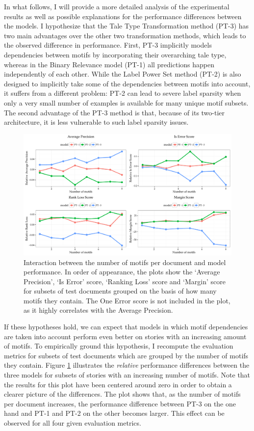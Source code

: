 In what follows, I will provide a more detailed analysis of the experimental results as well as possible explanations for the performance differences between the models. I hypothesize that the Tale Type Transformation method (PT-3) has two main advantages over the other two transformation methods, which leads to the observed difference in performance. First, PT-3 implicitly models dependencies between motifs by incorporating their overarching tale type, whereas in the Binary Relevance model (PT-1) all predictions happen independently of each other. While the Label Power Set method (PT-2) is also designed to implicitly take some of the dependencies between motifs into account, it suffers from a different problem: PT-2 can lead to severe label sparsity when only a very small number of examples is available for many unique motif subsets. The second advantage of the PT-3 method is that, because of its two-tier architecture, it is less vulnerable to such label sparsity issues. 

\begin{figure}[t]
\centering
\includegraphics[width=\textwidth]{images/motif-evaluation-scores-size.pdf}
\caption{Interaction between the number of motifs per document and model performance. In order of appearance, the plots show the `Average Precision', `Is Error' score, `Ranking Loss' score and `Margin' score for subsets of test documents grouped on the basis of how many motifs they contain. The One Error score is not included in the plot, as it highly correlates with the Average Precision.}
\label{fig:motif-size-classification}
\end{figure}

If these hypotheses hold, we can expect that models in which motif dependencies are taken into account perform even better on stories with an increasing amount of motifs. To empirically ground this hypothesis, I recompute the evaluation metrics for subsets of test documents which are grouped by the number of motifs they contain. Figure \ref{fig:motif-size-classification} illustrates the \emph{relative} performance differences between the three models for subsets of stories with an increasing number of motifs. Note that the results for this plot have been centered around zero in order to obtain a clearer picture of the differences. The plot shows that, as the number of motifs per document increases, the performance difference between PT-3 on the one hand and PT-1 and PT-2 on the other becomes larger. This effect can be observed for all four given evaluation metrics. 

